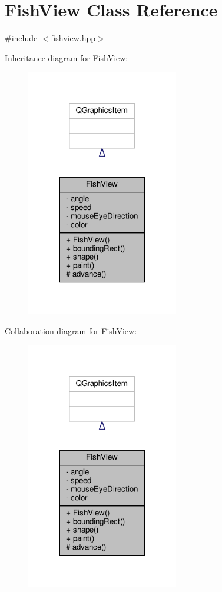 \hypertarget{classFishView}{}\section{Fish\+View Class Reference}
\label{classFishView}


{\ttfamily \#include $<$fishview.\+hpp$>$}



Inheritance diagram for Fish\+View\+:\nopagebreak
\begin{figure}[H]
\begin{center}
\leavevmode
\includegraphics[width=188pt]{classFishView__inherit__graph}
\end{center}
\end{figure}


Collaboration diagram for Fish\+View\+:\nopagebreak
\begin{figure}[H]
\begin{center}
\leavevmode
\includegraphics[width=188pt]{classFishView__coll__graph}
\end{center}
\end{figure}

